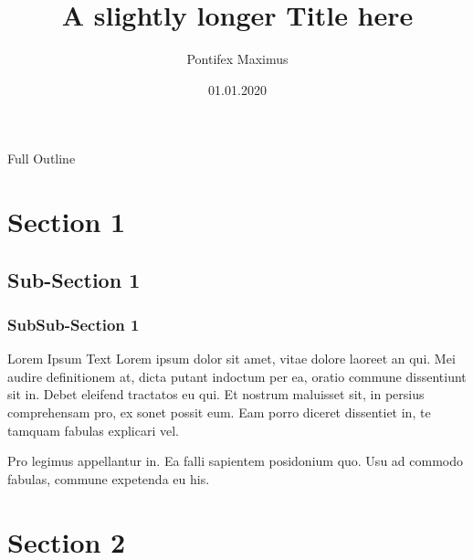 \documentclass[11pt,usenames,dvipsnames]{beamer}
\author[P. Maximus]{Pontifex Maximus}
\title[My short Title]{A slightly longer Title here}
\institute{Basilica Sancti Petri}
\date[01.01.20]{01.01.2020}
\begin{document}


\begin{frame}
    \titlepage
\end{frame}


\begin{frame}{Full Outline}
\tableofcontents
\end{frame}

\section{Section 1}
\subsection{Sub-Section 1}
\subsubsection{SubSub-Section 1}
\begin{frame}{Lorem Ipsum Text}
    Lorem ipsum dolor sit amet, vitae dolore laoreet an qui. 
    Mei audire definitionem at, dicta putant indoctum per ea, 
    oratio commune dissentiunt sit in. Debet eleifend tractatos eu qui. 
    Et nostrum maluisset sit, in persius comprehensam pro, ex sonet possit eum. 
    Eam porro diceret dissentiet in, te tamquam fabulas explicari vel.

    Pro legimus appellantur in\footnotemark[1]. Ea falli sapientem posidonium quo. 
    Usu ad commodo fabulas, commune expetenda eu his. 

\end{frame}

\section{Section 2}
\end{document}
